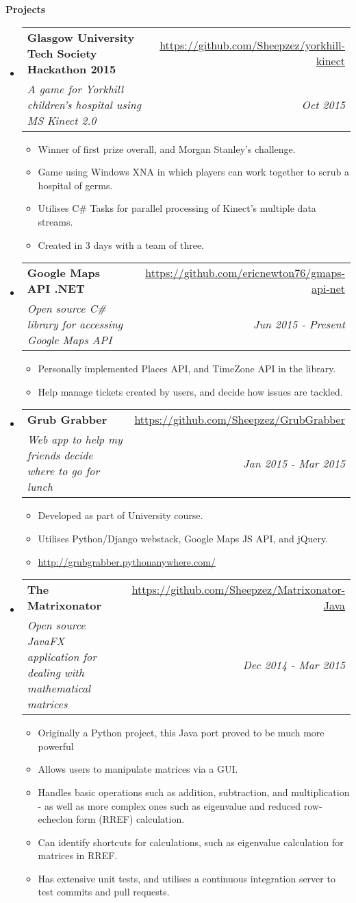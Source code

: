 \documentclass[letterpaper,11pt]{article}
\makeatletter
\newcommand{\resitem}[1]{\item #1 \vspace{-2pt}}
\newcommand{\resheading}[1]{{\large \colorbox{mygrey}{\begin{minipage}{\textwidth}{\textbf{#1 \vphantom{p\^{E}}}}\end{minipage}}}}
\newcommand{\ressubheading}[4]{
\begin{tabular*}{7.0in}{l@{\extracolsep{\fill}}r}
		\textbf{#1} & #2 \\
		\textit{#3} & \textit{#4} \\
\end{tabular*}\vspace{-6pt}}
\makeatother
\begin{document}
\resheading{Projects}
\begin{itemize}
\item
	\ressubheading{Glasgow University Tech Society Hackathon 2015}{\url{https://github.com/Sheepzez/yorkhill-kinect}}
	{A game for Yorkhill children's hospital using MS Kinect 2.0}{Oct 2015}
	\begin{itemize}
		\resitem{Winner of first prize overall, and Morgan Stanley's challenge.}
		\resitem{Game using Windows XNA in which players can work together to scrub a hospital of germs.}
		\resitem{Utilises C\# Tasks for parallel processing of Kinect's multiple data streams.}
		\resitem{Created in 3 days with a team of three.}
	\end{itemize}

\item
	\ressubheading{Google Maps API .NET}{\url{https://github.com/ericnewton76/gmaps-api-net}}
	{Open source C\# library for accessing Google Maps API}{Jun 2015 - Present}
	\begin{itemize}
		\resitem{Personally implemented Places API, and TimeZone API in the library.}
		\resitem{Help manage tickets created by users, and decide how issues are tackled.}
	\end{itemize}

\item
	\ressubheading{Grub Grabber}{\url{https://github.com/Sheepzez/GrubGrabber}}
	{Web app to help my friends decide where to go for lunch}{Jan 2015 - Mar 2015}
	\begin{itemize}
		\resitem{Developed as part of University course.}
		\resitem{Utilises Python/Django webstack, Google Maps JS API, and jQuery.}
		\resitem{\url{http://grubgrabber.pythonanywhere.com/}}
	\end{itemize}

\item
	\ressubheading{The Matrixonator}{\url{https://github.com/Sheepzez/Matrixonator-Java}}
	{Open source JavaFX application for dealing with mathematical matrices}{Dec 2014 - Mar 2015}
	\begin{itemize}
		\resitem{Originally a Python project, this Java port proved to be much more powerful}
		\resitem{Allows users to manipulate matrices via a GUI.}
		\resitem{Handles basic operations such as addition, subtraction, and multiplication - as well as
		more complex ones such as eigenvalue and reduced row-echeclon form (RREF) calculation.}
		\resitem{Can identify shortcuts for calculations, such as eigenvalue calculation for matrices in RREF.}
		\resitem{Has extensive unit tests, and utilises a continuous integration server to test commits and pull requests.}
	\end{itemize}

\end{itemize}
\end{document}
